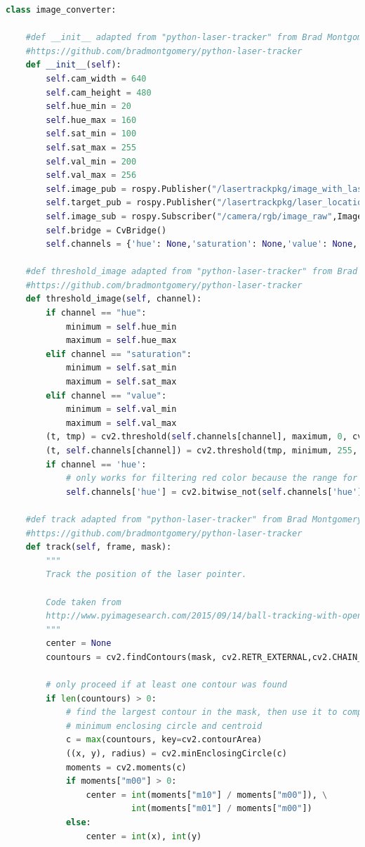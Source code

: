 \documentclass{article}
\begin{document}
\begin{appendices}
\begin{lstlisting}[language=Python]
class image_converter:
 
    #def __init__ adapted from "python-laser-tracker" from Brad Montgomery, Aug 2016
    #https://github.com/bradmontgomery/python-laser-tracker
    def __init__(self):
        self.cam_width = 640
        self.cam_height = 480
        self.hue_min = 20
        self.hue_max = 160
        self.sat_min = 100
        self.sat_max = 255
        self.val_min = 200
        self.val_max = 256    
        self.image_pub = rospy.Publisher("/lasertrackpkg/image_with_laser_track",Image)
        self.target_pub = rospy.Publisher("/lasertrackpkg/laser_location", laser_location_msg)    
        self.image_sub = rospy.Subscriber("/camera/rgb/image_raw",Image,self.callback)
        self.bridge = CvBridge()
        self.channels = {'hue': None,'saturation': None,'value': None,'laser': None}    
  
    #def threshold_image adapted from "python-laser-tracker" from Brad Montgomery, Aug 2016
    #https://github.com/bradmontgomery/python-laser-tracker
    def threshold_image(self, channel):
        if channel == "hue":
            minimum = self.hue_min
            maximum = self.hue_max
        elif channel == "saturation":
            minimum = self.sat_min
            maximum = self.sat_max
        elif channel == "value":
            minimum = self.val_min
            maximum = self.val_max
        (t, tmp) = cv2.threshold(self.channels[channel], maximum, 0, cv2.THRESH_TOZERO_INV)
        (t, self.channels[channel]) = cv2.threshold(tmp, minimum, 255, cv2.THRESH_BINARY)
        if channel == 'hue':
            # only works for filtering red color because the range for the hue is split
            self.channels['hue'] = cv2.bitwise_not(self.channels['hue'])  
  
    #def track adapted from "python-laser-tracker" from Brad Montgomery, Aug 2016
    #https://github.com/bradmontgomery/python-laser-tracker
    def track(self, frame, mask):
        """
        Track the position of the laser pointer.

        Code taken from
        http://www.pyimagesearch.com/2015/09/14/ball-tracking-with-opencv/
        """
        center = None
        countours = cv2.findContours(mask, cv2.RETR_EXTERNAL,cv2.CHAIN_APPROX_SIMPLE)[-2]

        # only proceed if at least one contour was found
        if len(countours) > 0:
            # find the largest contour in the mask, then use it to compute the 
            # minimum enclosing circle and centroid
            c = max(countours, key=cv2.contourArea)
            ((x, y), radius) = cv2.minEnclosingCircle(c)
            moments = cv2.moments(c)
            if moments["m00"] > 0:
                center = int(moments["m10"] / moments["m00"]), \
                         int(moments["m01"] / moments["m00"])
            else:
                center = int(x), int(y)


\end{lstlisting}
\end{appendices}
\end{document}
